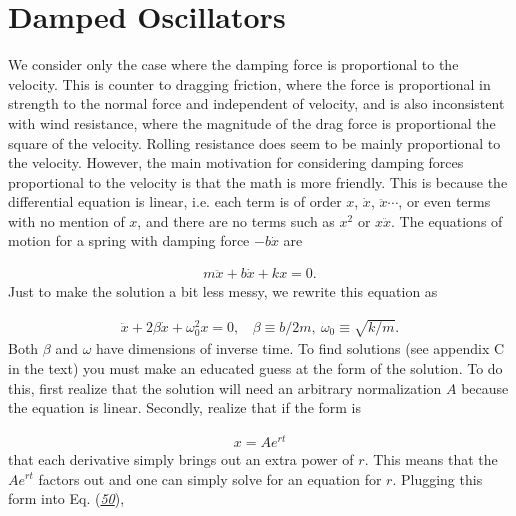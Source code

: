 \documentclass[letterpaper,10pt,english]{sphinxmanual}
\begin{document}
\section{Damped Oscillators}
\label{\detokenize{chapter1:damped-oscillators}}
We consider only the case where the damping force is proportional to
the velocity. This is counter to dragging friction, where the force is
proportional in strength to the normal force and independent of
velocity, and is also inconsistent with wind resistance, where the
magnitude of the drag force is proportional the square of the
velocity. Rolling resistance does seem to be mainly proportional to
the velocity. However, the main motivation for considering damping
forces proportional to the velocity is that the math is more
friendly. This is because the differential equation is linear,
i.e. each term is of order \(x\), \(\dot{x}\), \(\ddot{x}\cdots\), or even
terms with no mention of \(x\), and there are no terms such as \(x^2\) or
\(x\ddot{x}\). The equations of motion for a spring with damping force
\(-b\dot{x}\) are




\begin{equation*}
\begin{split}
\begin{equation}
m\ddot{x}+b\dot{x}+kx=0.
\label{_auto39} \tag{49}
\end{equation}
\end{split}
\end{equation*}
Just to make the solution a bit less messy, we rewrite this equation as




\begin{equation*}
\begin{split}
\begin{equation}
\label{eq:dampeddiffyq} \tag{50}
\ddot{x}+2\beta\dot{x}+\omega_0^2x=0,~~~~\beta\equiv b/2m,~\omega_0\equiv\sqrt{k/m}.
\end{equation}
\end{split}
\end{equation*}
Both \(\beta\) and \(\omega\) have dimensions of inverse time. To find solutions (see appendix C in the text) you must make an educated guess at the form of the solution. To do this, first realize that the solution will need an arbitrary normalization \(A\) because the equation is linear. Secondly, realize that if the form is




\begin{equation*}
\begin{split}
\begin{equation}
x=Ae^{rt}
\label{_auto40} \tag{51}
\end{equation}
\end{split}
\end{equation*}
that each derivative simply brings out an extra power of \(r\). This
means that the \(Ae^{rt}\) factors out and one can simply solve for an
equation for \(r\). Plugging this form into Eq. ({\hyperref[\detokenize{chapter1:eq:dampeddiffyq}]{\emph{50}}}),
\end{document}
